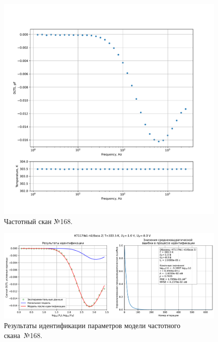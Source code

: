 \begin{figure}[!ht]
    \centering
    \includegraphics[width=1\textwidth]{../plots/КТ117№1_п1(база 2)_2500Гц-1Гц_1пФ_+30С_-1В-8В_200мВ_20мкс_шаг_0,1.pdf}
    \caption{Частотный скан №168.}
    \label{pic:frequency_scan_168}
\end{figure}

\begin{figure}[!ht]
    \centering
    \includegraphics[width=1\textwidth]{../plots/КТ117№1_п1(база 2)_2500Гц-1Гц_1пФ_+30С_-1В-8В_200мВ_20мкс_шаг_0,1_model.pdf}
    \caption{Результаты идентификации параметров модели частотного скана~№168.}
    \label{pic:frequency_scan_model168}
\end{figure}

\pagebreak


